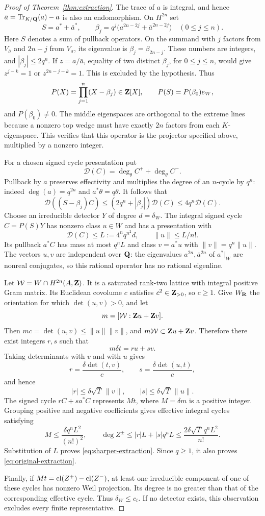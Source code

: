 \begin{proof}[Proof of Theorem~\ref{thm:extraction}]
The trace of $a$ is integral, and hence $\bar a=\operatorname{Tr}_{K/\mathbf Q}(a)-a$ is also an endomorphism. On $H^{2n}$ set
\[
 S=a^*+\bar a^*,\qquad
 \beta_j=q^j\bigl(a^{2n-2j}+\bar a^{2n-2j}\bigr)
 \quad(0\leq j\leq n).
\]
Here $S$ denotes a sum of pullback operators. On the summand with $j$ factors from $V_{\bar\sigma}$ and $2n-j$ from $V_\sigma$, its eigenvalue is $\beta_j=\beta_{2n-j}$. These numbers are integers, and $|\beta_j|\leq2q^n$. If $z=a/\bar a$, equality of two distinct $\beta_j$, for $0\leq j\leq n$, would give $z^{j-k}=1$ or $z^{2n-j-k}=1$. This is excluded by the hypothesis. Thus
\[
 P(X)=\prod_{j=1}^n(X-\beta_j)\in\mathbf Z[X],\qquad
 P(S)=P(\beta_0)e_W,
\]
and $P(\beta_0)\ne0$. The middle eigenspaces are orthogonal to the extreme lines because a nonzero top wedge must have exactly $2n$ factors from each $K$-eigenspace. This verifies that this operator is the projector specified above, multiplied by a nonzero integer.

For a chosen signed cycle presentation put
\[
 \mathcal D(C)=\deg_\theta C^++\deg_\theta C^-.
\]
Pullback by $a$ preserves effectivity and multiplies the degree of an $n$-cycle by $q^n$: indeed $\deg(a)=q^{2n}$ and $a^*\theta=q\theta$. It follows that
\[
 \mathcal D((S-\beta_j)C)
 \leq(2q^n+|\beta_j|)\mathcal D(C)
 \leq4q^n\mathcal D(C).
\]
Choose an irreducible detector $Y$ of degree $d=\delta_W$. The integral signed cycle $C=P(S)Y$ has nonzero class $u\in W$ and has a presentation with
\[
 \mathcal D(C)\leq L:=4^nq^{n^2}d,
 \qquad \|u\|\leq L/n!.
\]
Its pullback $a^*C$ has mass at most $q^nL$ and class $v=a^*u$ with $\|v\|=q^n\|u\|$. The vectors $u,v$ are independent over $\mathbf Q$: the eigenvalues $a^{2n},\bar a^{2n}$ of $a^*|_W$ are nonreal conjugates, so this rational operator has no rational eigenline.

Let $\mathcal W=W\cap H^{2n}(A,\mathbf Z)$. It is a saturated rank-two lattice with integral positive Gram matrix. Its Euclidean covolume $c$ satisfies $c^2\in\mathbf Z_{>0}$, so $c\geq1$. Give $W_\mathbf R$ the orientation for which $\det(u,v)>0$, and let
\[
 m=[\mathcal W:\mathbf Z u+\mathbf Z v].
\]
Then $mc=\det(u,v)\leq\|u\|\|v\|$, and $m\mathcal W\subset\mathbf Z u+\mathbf Z v$. Therefore there exist integers $r,s$ such that
\[
 m\delta t=ru+sv.
\]
Taking determinants with $v$ and with $u$ gives
\[
 r=\frac{\delta\det(t,v)}c,\qquad
 s=\frac{\delta\det(u,t)}c,
\]
and hence
\[
 |r|\leq\delta\sqrt T\,\|v\|,
 \qquad |s|\leq\delta\sqrt T\,\|u\|.
\]
The signed cycle $rC+s a^*C$ represents $M t$, where $M=\delta m$ is a positive integer. Grouping positive and negative coefficients gives effective integral cycles satisfying
\[
 M\leq\frac{\delta q^nL^2}{(n!)^2},\qquad
 \deg Z^\pm\leq|r|L+|s|q^nL
 \leq\frac{2\delta\sqrt T\,q^nL^2}{n!}.
\]
Substitution of $L$ proves \eqref{eq:sharper-extraction}. Since $q\geq1$, it also proves \eqref{eq:original-extraction}.

Finally, if $Mt=\operatorname{cl}(Z^+)-\operatorname{cl}(Z^-)$, at least one irreducible component of one of these cycles has nonzero Weil projection. Its degree is no greater than that of the corresponding effective cycle. Thus $\delta_W\leq c_t$. If no detector exists, this observation excludes every finite representative.
\end{proof}

